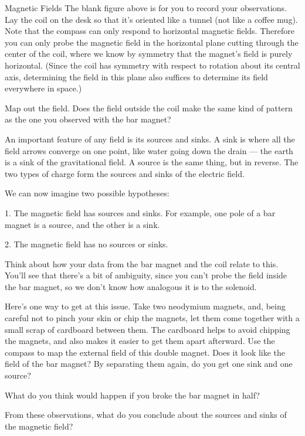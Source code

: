 \begin{lab}{Magnetic Fields}
The blank figure above is for you to record your observations.
Lay the coil on the desk so that it's oriented like a tunnel (not like a coffee mug).
Note that the compass can only respond to horizontal magnetic fields. Therefore
you can only probe the magnetic field in the horizontal plane cutting through the center
of the coil, where we know by symmetry that the magnet's field is purely horizontal.
(Since the coil has symmetry with respect to rotation about its central axis, determining
the field in this plane also suffices to determine its field everywhere in space.)


Map out the field. Does the field outside the coil make the same kind of pattern as the
one you observed with the bar magnet?


An important feature of any field is its sources and sinks. A sink is where all the field
arrows converge on one point, like water going down the drain --- the earth is a sink of
the gravitational field. A source is the same thing, but in reverse. The two types of
charge form the sources and sinks of the electric field.

We can now imagine two possible hypotheses:

1. The magnetic field has sources and sinks. For example, one pole of a bar magnet
is a source, and the other is a sink.

2. The magnetic field has no sources or sinks.

Think about how your data from the bar magnet and the coil relate to this.
You'll see that there's a bit of ambiguity, since you can't probe the field inside
the bar magnet, so we don't know how analogous it is to the solenoid. 

Here's one way to get at this issue. Take two neodymium magnets, and, being careful
not to pinch your skin or chip the magnets, let them come together with a small
scrap of cardboard between them. The cardboard helps to avoid chipping the magnets,
and also makes it easier to get them apart afterward. Use the compass to map the
external field of this double magnet. Does it look like the field of the bar magnet?
By separating them again, do you get one sink and one source?

What do you think would happen if you broke the bar magnet in half?

From these observations, what do you conclude about the sources and sinks
of the magnetic field?


\end{lab}

